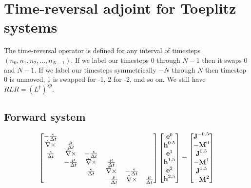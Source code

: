 \section{Time-reversal adjoint for Toeplitz systems}

The time-reversal operator is defined for any interval of timesteps $(n_0, n_1, n_2, ..., n_{N-1})$.  If we label our timesteps 0 through $N-1$ then it swaps $0$ and $N-1$.  If we label our timesteps symmetrically $-N$ through $N$ then timestep 0 is unmoved, 1 is swapped for -1, 2 for -2, and so on.  We still have $RLR = (L^\dagger)^{sp}$.

\subsection{Forward system}

\begin{equation}
\begin{bmatrix}
- \frac{\epsilon}{\Delta t} & & & & & \\
\tilde{\nabla} \times & \frac{\mu}{\Delta t} & & & & \\
\frac{\epsilon}{\Delta t} & \hat{\nabla} \times & -\frac{\epsilon}{\Delta t} & & & \\
& -\frac{\mu}{\Delta t} & \tilde{\nabla} \times & \frac{\mu}{\Delta t} & &  \\
& & \frac{\epsilon}{\Delta t} & \hat{\nabla} \times & -\frac{\epsilon}{\Delta t} & \\
& & & -\frac{\mu}{\Delta t} & \tilde{\nabla} \times & \frac{\mu}{\Delta t}
\end{bmatrix}
%
\begin{bmatrix}
\ve e^0 \\ \ve h^{0.5} \\ \ve e^1 \\ \ve h^{1.5} \\ \ve e^2 \\ \ve h^{2.5}
\end{bmatrix}
=
\begin{bmatrix}
\ve J^{-0.5} \\ -\ve M^0 \\ \ve J^{0.5} \\ -\ve M^1 \\ \ve J^{1.5} \\ -\ve M^2 
\end{bmatrix}
\end{equation}

